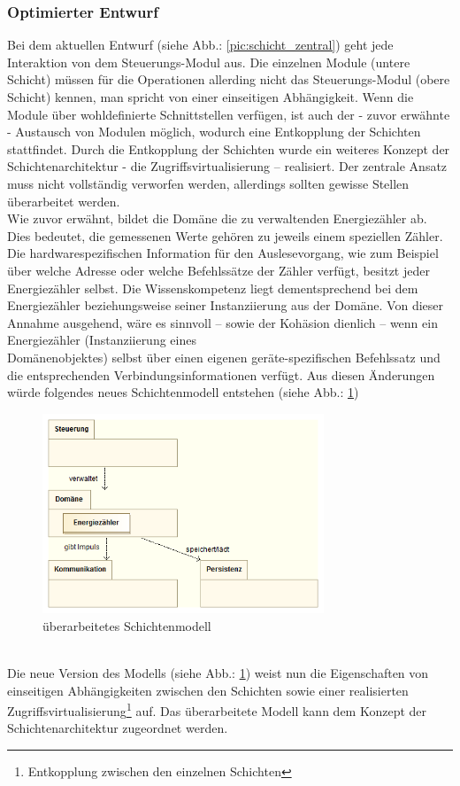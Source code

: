 \documentclass[Bachelorarbeit.tex]{subfiles}
\begin{document}
\subsubsection*{Optimierter Entwurf}
Bei dem aktuellen Entwurf (siehe Abb.: \ref{pic:schicht_zentral}) geht jede Interaktion von dem Steuerungs-Modul aus. Die einzelnen Module (untere Schicht) müssen für die Operationen allerding nicht das Steuerungs-Modul (obere Schicht) kennen, man spricht von einer einseitigen 
Abhängigkeit. Wenn die Module über wohldefinierte Schnittstellen verfügen, ist auch 
der - zuvor erwähnte - Austausch von Modulen möglich, wodurch eine Entkopplung 
der Schichten stattfindet. Durch die Entkopplung der Schichten wurde ein weiteres
Konzept der Schichtenarchitektur - die Zugriffsvirtualisierung – realisiert. Der zentrale 
Ansatz muss nicht vollständig verworfen werden, allerdings sollten gewisse Stellen 
überarbeitet werden. \\
Wie zuvor erwähnt, bildet die Domäne die zu verwaltenden Energiezähler ab. 
Dies bedeutet, die gemessenen Werte gehören zu jeweils einem speziellen Zähler. 
Die hardwarespezifischen Information für den Auslesevorgang, wie zum Beispiel über welche Adresse oder 
welche Befehlssätze der Zähler verfügt, besitzt jeder Energiezähler selbst.  Die Wissenskompetenz liegt dementsprechend bei dem
Energiezähler beziehungsweise seiner Instanziierung aus der Domäne. 
Von dieser Annahme ausgehend, wäre es sinnvoll – sowie der Kohäsion dienlich – wenn ein Energiezähler (Instanziierung eines \\
Domänenobjektes) selbst über einen eigenen geräte-spezifischen Befehlssatz und die entsprechenden Verbindungsinformationen verfügt. 
Aus diesen Änderungen würde folgendes neues Schichtenmodell entstehen (siehe Abb.: \ref{pic:schicht_optimiert})\\
\begin{figure}[h]
\includegraphics[width=0.75\textwidth]{./img/Schichtenarchitektur_optimiert.png}
\caption{überarbeitetes Schichtenmodell}
\label{pic:schicht_optimiert}
\end{figure}
\\
Die neue Version des Modells (siehe Abb.: \ref{pic:schicht_optimiert}) weist nun die Eigenschaften von 
einseitigen Abhängigkeiten zwischen den Schichten sowie einer realisierten 
Zugriffsvirtualisierung\footnote{Entkopplung zwischen den einzelnen Schichten} auf. Das überarbeitete Modell kann dem Konzept der 
Schichtenarchitektur zugeordnet werden.
\end{document}
